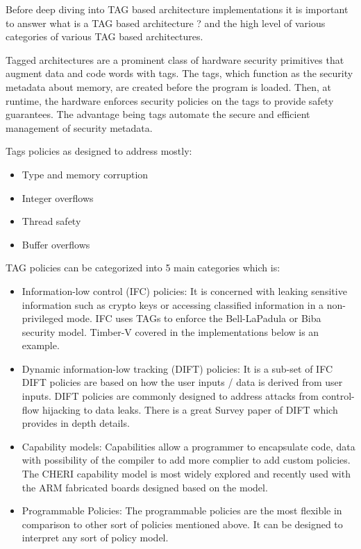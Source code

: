Before deep diving into TAG based architecture implementations it is important to 
answer what is a TAG based architecture ? and the high level of various 
categories of various TAG based architectures.

Tagged architectures are a prominent class of hardware security primitives that augment data and code words
with tags. The tags, which function as the security metadata
about memory, are created before the program is loaded. 
Then, at runtime, the hardware enforces security policies on the tags to provide safety guarantees. 
The advantage being tags automate the secure and efficient management of security metadata. 

Tags policies as designed to address mostly:
\begin{itemize}
  \item Type and memory corruption
  \item Integer overflows
  \item Thread safety
  \item Buffer overflows
\end{itemize}

TAG policies can be categorized into 5 main categories which is:
\begin{itemize}
  \item Information-low control (IFC) policies: It is concerned with 
  leaking sensitive information such as crypto keys or accessing classified 
  information in a non-privileged mode. IFC uses TAGs to enforce the 
  Bell-LaPadula\cite{BellAndLaPadulaSecurityModel} or Biba\cite{Biba} security model. Timber-V\cite{weiser_timber-v_2019} 
  covered in the implementations below is an example.
  \item Dynamic information-low tracking (DIFT) policies: It is a sub-set of IFC
  DIFT policies are based on how the user inputs / data is derived from user 
  inputs. DIFT policies are commonly designed to address attacks from
  control-flow hijacking to data leaks. There is a great Survey paper of 
  DIFT\cite{DIFT} which provides in depth details. 
  \item Capability models: Capabilities allow a programmer to 
  encapsulate code, data with possibility of the compiler to 
  add more complier to add custom policies. The CHERI capability 
  model is most widely explored\cite{CHERI-RISC} and 
  recently used with the
  ARM fabricated boards\cite{morello} 
  designed based on the model. 
  \item Programmable Policies: The programmable policies 
  are the most flexible in comparison to other 
  sort of policies mentioned above. It can be 
  designed to interpret any sort of policy model.

\end{itemize}

